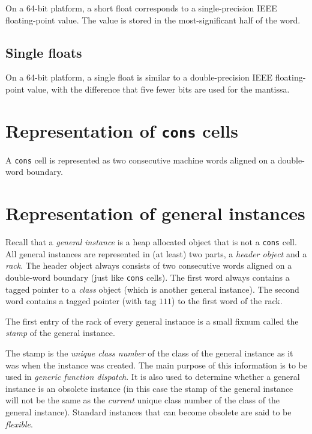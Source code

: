 On a 64-bit platform, a short float corresponds to a single-precision
IEEE floating-point value.  The value is stored in the
most-significant half of the word.

\subsection{Single floats}

On a 64-bit platform, a single float is similar to a double-precision
IEEE floating-point value, with the difference that five fewer bits
are used for the mantissa.

\section{Representation of \texttt{cons} cells}
\label{sec-data-representation-cons-cells}

A \texttt{cons} cell is represented as two consecutive machine
words aligned on a double-word boundary.

\section{Representation of general instances}
\label{sec-data-representation-general-instances}

Recall that a \emph{general instance} is a heap allocated object that
is not a \texttt{cons} cell.  All general instances are represented in
(at least) two parts, a \emph{header object} and a \emph{rack}.  The
header object always consists of two consecutive words aligned on a
double-word boundary (just like \texttt{cons} cells).  The first word
always contains a tagged pointer to a \emph{class} object (which is
another general instance).  The second word contains a tagged pointer
(with tag $111$) to the first word of the rack.

The first entry of the rack of every general instance is a
small fixnum called the \emph{stamp} of the general instance. 

The
stamp is the \emph{unique class number} of the class of the general
instance as it was when the instance was created.  The main purpose of
this information is to be used in \emph{generic function dispatch}.
It is also used to determine whether a general instance is an obsolete
instance (in this case the stamp of the general instance will not be
the same as the \emph{current} unique class number of the class of the
general instance).  Standard instances that can become obsolete are
said to be \emph{flexible}.

